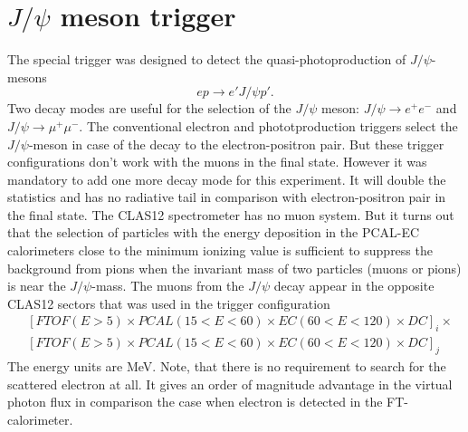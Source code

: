 \section{$J/\psi$ meson trigger}

The special trigger was designed to detect the quasi-photoproduction of $J/\psi$-mesons
$$
ep \to e' J/\psi p'.
$$
Two decay modes are useful for the selection of the $J/\psi$ meson: $J/\psi \to e^+e^-$ and $J/\psi \to \mu^+\mu^-$.
The conventional electron and phototproduction triggers  select the $J/\psi$-meson  in case of the decay to the electron-positron pair.
But these trigger configurations don't  work  with the muons in the final state. However it was mandatory to add one more decay mode for this experiment. It will double the statistics and has no radiative tail in comparison with electron-positron pair in the final state. The CLAS12 spectrometer has no muon system. But it turns out that the selection of particles with the energy deposition in the
PCAL-EC  calorimeters close to the minimum  ionizing  value is sufficient to suppress the background from pions when the 
invariant mass of two  particles (muons or pions) is near the $J/\psi$-mass. The muons from the $J/\psi$ decay appear in the opposite CLAS12 sectors that was used in the trigger configuration  
\begin{align*} 
 & [FTOF(E{{>}}5){\times}  PCAL(15{<}E{<}60){\times} EC(60{<}E{<}120){\times}   DC]_i {\times} \\
 & [FTOF(E{{>}}5){\times}  PCAL(15{<}E{<}60){\times} EC(60{<}E{<}120){\times}   DC]_j  
\end{align*}
\noindent
The energy units are MeV. Note, that there is no requirement to search for the scattered electron at all. It gives an order of magnitude advantage in the  virtual photon flux in comparison the case when electron is detected in the FT-calorimeter.




